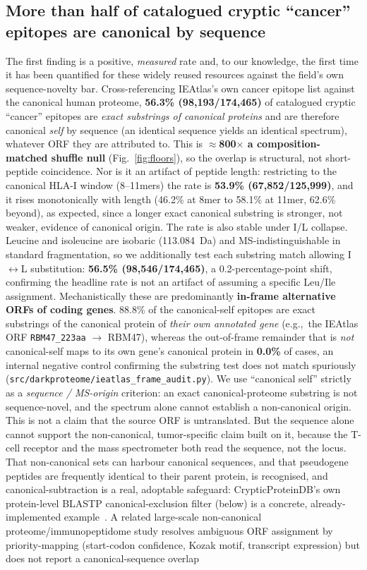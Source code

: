 \subsection{More than half of catalogued cryptic ``cancer'' epitopes are canonical by sequence}
The first finding is a positive, \emph{measured} rate and, to our knowledge, the first time it has been quantified for these widely reused resources against the field's own sequence-novelty bar. Cross-referencing IEAtlas's own cancer epitope list against the canonical human proteome, \textbf{56.3\% (98{,}193/174{,}465)} of catalogued cryptic ``cancer'' epitopes are \emph{exact substrings of canonical proteins} and are therefore canonical \emph{self} by sequence (an identical sequence yields an identical spectrum), whatever ORF they are attributed to. This is \textbf{$\approx$800$\times$ a composition-matched shuffle null} (Fig.~\ref{fig:floors}), so the overlap is structural, not short-peptide coincidence. Nor is it an artifact of peptide length: restricting to the canonical HLA-I window (8--11mers) the rate is \textbf{53.9\% (67{,}852/125{,}999)}, and it rises monotonically with length (46.2\% at 8mer to 58.1\% at 11mer, 62.6\% beyond), as expected, since a longer exact canonical substring is stronger, not weaker, evidence of canonical origin. The rate is also stable under I/L collapse. Leucine and isoleucine are isobaric (113.084~Da) and MS-indistinguishable in standard fragmentation, so we additionally test each substring match allowing I$\leftrightarrow$L substitution: \textbf{56.5\% (98{,}546/174{,}465)}, a 0.2-percentage-point shift, confirming the headline rate is not an artifact of assuming a specific Leu/Ile assignment. Mechanistically these are predominantly \textbf{in-frame alternative ORFs of coding genes}. 88.8\% of the canonical-self epitopes are exact substrings of the canonical protein of \emph{their own annotated gene} (e.g.,\ the IEAtlas ORF \texttt{RBM47\_223aa} $\to$ RBM47), whereas the out-of-frame remainder that is \emph{not} canonical-self maps to its own gene's canonical protein in \textbf{0.0\%} of cases, an internal negative control confirming the substring test does not match spuriously (\texttt{src/darkproteome/ieatlas\_frame\_audit.py}). We use ``canonical self'' strictly as a \emph{sequence / MS-origin} criterion: an exact canonical-proteome substring is not sequence-novel, and the spectrum alone cannot establish a non-canonical origin. This is not a claim that the source ORF is untranslated. But the sequence alone cannot support the non-canonical, tumor-specific claim built on it, because the T-cell receptor and the mass spectrometer both read the sequence, not the locus. That non-canonical sets can harbour canonical sequences, and that pseudogene peptides are frequently identical to their parent protein, is recognised, and canonical-subtraction is a real, adoptable safeguard: CrypticProteinDB's own protein-level BLASTP canonical-exclusion filter (below) is a concrete, already-implemented example~\cite{r15}. A related large-scale non-canonical proteome/immunopeptidome study resolves ambiguous ORF assignment by priority-mapping (start-codon confidence, Kozak motif, transcript expression) but does not report a canonical-sequence overlap 